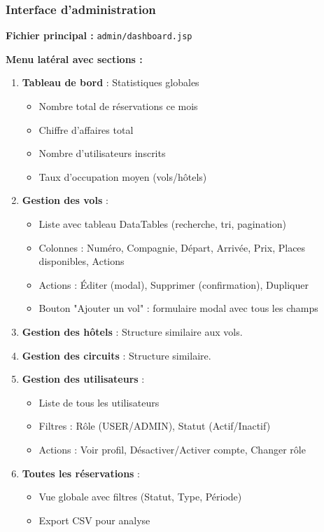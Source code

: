 \documentclass[12pt,a4paper]{report}
\begin{document}
\subsubsection{Interface d'administration}

\textbf{Fichier principal :} \texttt{admin/dashboard.jsp}

\textbf{Menu latéral avec sections :}

\begin{enumerate}
    \item \textbf{Tableau de bord} : Statistiques globales
    \begin{itemize}
        \item Nombre total de réservations ce mois
        \item Chiffre d'affaires total
        \item Nombre d'utilisateurs inscrits
        \item Taux d'occupation moyen (vols/hôtels)
    \end{itemize}
    
    \item \textbf{Gestion des vols} :
    \begin{itemize}
        \item Liste avec tableau DataTables (recherche, tri, pagination)
        \item Colonnes : Numéro, Compagnie, Départ, Arrivée, Prix, Places disponibles, Actions
        \item Actions : Éditer (modal), Supprimer (confirmation), Dupliquer
        \item Bouton "Ajouter un vol" : formulaire modal avec tous les champs
    \end{itemize}
    
    \item \textbf{Gestion des hôtels} : Structure similaire aux vols.
    
    \item \textbf{Gestion des circuits} : Structure similaire.
    
    \item \textbf{Gestion des utilisateurs} :
    \begin{itemize}
        \item Liste de tous les utilisateurs
        \item Filtres : Rôle (USER/ADMIN), Statut (Actif/Inactif)
        \item Actions : Voir profil, Désactiver/Activer compte, Changer rôle
    \end{itemize}
    
    \item \textbf{Toutes les réservations} :
    \begin{itemize}
        \item Vue globale avec filtres (Statut, Type, Période)
        \item Export CSV pour analyse
    \end{itemize}
\end{enumerate}
\end{document}
